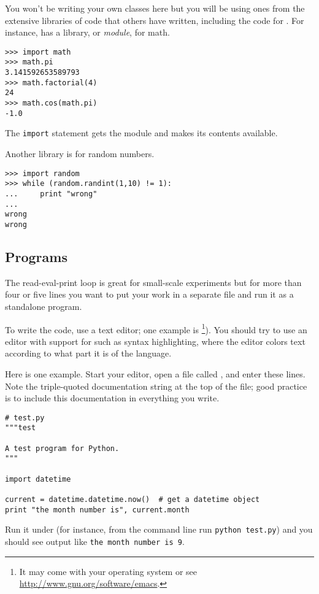 You won't be writing your own classes here but you will be using ones from
the extensive libraries of code that others have written, including the
code for \sage. 
For instance, \python{} has a library, or \textit{module}, for math.
\begin{lstlisting}[style=python]
>>> import math
>>> math.pi
3.141592653589793
>>> math.factorial(4)
24
>>> math.cos(math.pi)
-1.0
\end{lstlisting}
The \lstinline[style=inline]!import! statement gets the module and makes
its contents available.

Another library is for random numbers.
\begin{lstlisting}[style=python]
>>> import random
>>> while (random.randint(1,10) != 1):
...     print "wrong"
... 
wrong
wrong
\end{lstlisting}



\subsection{Programs}
The read-eval-print loop is great for small-scale experiments but
for more than four or five lines you 
want to put your work in a separate file and run it as a standalone program.

To write the code, use a text editor; one example is 
\footnote{It may come with your operating system or see \protect\url{http://www.gnu.org/software/emacs}.}).
You should try to use an editor with support for \python{} such as 
syntax highlighting, where the editor colors text according to what part
it is of the language.

Here is one example.
Start your editor, open a file called , and enter these lines.
Note the triple-quoted documentation string at the top of the file; 
good practice is to include this documentation in everything you write.
\begin{lstlisting}[style=python]
# test.py
"""test

A test program for Python. 
"""

import datetime
 
current = datetime.datetime.now()  # get a datetime object
print "the month number is", current.month
\end{lstlisting}
Run it under \python{} (for instance, from the command line
run \lstinline[style=inline]!python test.py!) and you should see
output like \lstinline[style=inline]!the month number is 9!.

